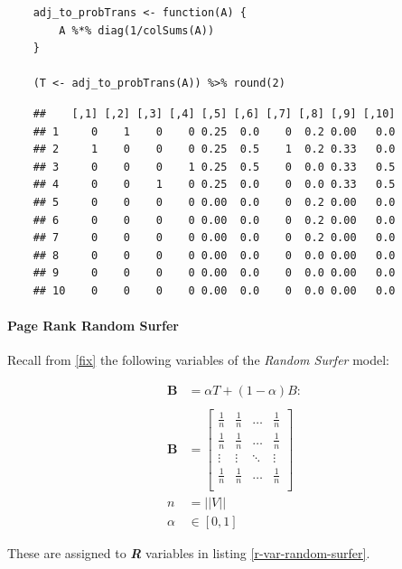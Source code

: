\documentclass[11pt]{report}
\begin{document}
\begin{tcolorbox}
    \begin{verbatim}
    adj_to_probTrans <- function(A) {
        A %*% diag(1/colSums(A))
    }

    (T <- adj_to_probTrans(A)) %>% round(2)
    \end{verbatim}
\tcblower
    \begin{verbatim}
    ##    [,1] [,2] [,3] [,4] [,5] [,6] [,7] [,8] [,9] [,10]
    ## 1     0    1    0    0 0.25  0.0    0  0.2 0.00   0.0
    ## 2     1    0    0    0 0.25  0.5    1  0.2 0.33   0.0
    ## 3     0    0    0    1 0.25  0.5    0  0.0 0.33   0.5
    ## 4     0    0    1    0 0.25  0.0    0  0.0 0.33   0.5
    ## 5     0    0    0    0 0.00  0.0    0  0.2 0.00   0.0
    ## 6     0    0    0    0 0.00  0.0    0  0.2 0.00   0.0
    ## 7     0    0    0    0 0.00  0.0    0  0.2 0.00   0.0
    ## 8     0    0    0    0 0.00  0.0    0  0.0 0.00   0.0
    ## 9     0    0    0    0 0.00  0.0    0  0.0 0.00   0.0
    ## 10    0    0    0    0 0.00  0.0    0  0.0 0.00   0.0
    \end{verbatim}
\end{tcolorbox}

\paragraph{Page Rank Random Surfer}
\label{page-rank-random-surfer}
Recall from \ref{fix} the following variables of the \emph{Random Surfer} model:


\begin{align}
    \mathbf{B} &= \alpha T +  \left( 1- \alpha \right)B :\\
\ \\
    \mathbf{B}&= \begin{bmatrix}
    \frac{1}{n} & \frac{1}{n} & \ldots & \frac{1}{n} \\
    \frac{1}{n} & \frac{1}{n} & \ldots & \frac{1}{n} \\
        \vdots      & \vdots      & \ddots & \vdots  \\
    \frac{1}{n} & \frac{1}{n} & \ldots & \frac{1}{n} \\
    \end{bmatrix} \label{eq:bgval1} \\
    n&= \left| \left| V \right| \right| \\
    \alpha &\in [0,1]
\end{align}

These are
assigned to \emph{\textbf{R}} variables in listing \ref{r-var-random-surfer}.
\end{document}
